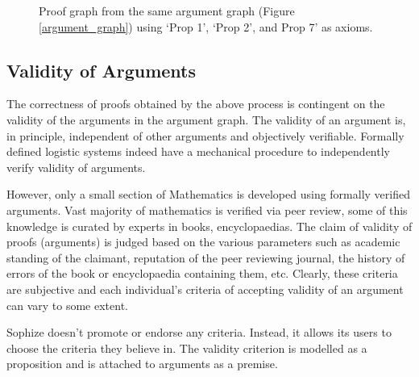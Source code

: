 \documentclass[a4paper]{article}
\begin{document}
\begin{figure}[htbp]
\begin{center}
\caption{Proof graph from the same argument graph (Figure \ref{argument_graph}) using `Prop 1', `Prop 2', and Prop 7' as axioms.}
\label{proof_graph2}
\end{center}
\end{figure}

\subsection{Validity of Arguments}

The correctness of proofs obtained by the above process is contingent on the validity of the arguments in the argument graph. The validity of an argument is, in principle, independent of other arguments and objectively verifiable. Formally defined logistic systems indeed have a mechanical procedure to independently verify validity of arguments.

However, only a small section of Mathematics is developed using formally verified arguments. Vast majority of mathematics is verified via peer review, some of this knowledge is curated by experts in books, encyclopaedias. The claim of validity of proofs (arguments) is judged based on the various parameters such as academic standing of the claimant, reputation of the peer reviewing journal, the history of errors of the book or encyclopaedia containing them, etc. Clearly, these criteria are subjective and each individual's criteria of accepting validity of an argument can vary to some extent.

Sophize doesn't promote or endorse any criteria. Instead, it allows its users to choose the criteria they believe in. The validity criterion is modelled as a proposition and is attached to arguments as a premise. 
\end{document}
